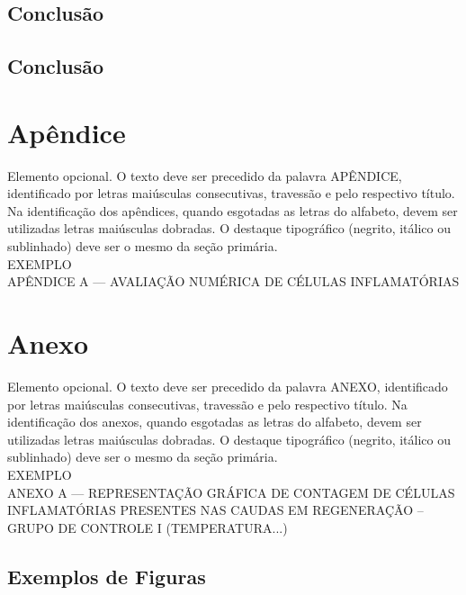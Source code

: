 \documentclass{Arquivos/TrabalhoAcademico}
\begin{document}
\section{Conclusão}
\lipsum[1]
\section{Conclusão}
\lipsum[1]


\postextual %


\printbibliography[heading=none]


\inicioApendices
\chapter{Apêndice}
Elemento opcional. O texto deve ser precedido da palavra APÊNDICE, identificado por letras maiúsculas
consecutivas, travessão e pelo respectivo título. Na identificação dos apêndices, quando esgotadas
as letras do alfabeto, devem ser utilizadas letras maiúsculas dobradas. O destaque tipográfico (negrito,
itálico ou sublinhado) deve ser o mesmo da seção primária.\\[1em]

\noindent EXEMPLO\\[1em]

\noindent APÊNDICE A — AVALIAÇÃO NUMÉRICA DE CÉLULAS INFLAMATÓRIAS


\inicioAnexos
\chapter{Anexo}
Elemento opcional. O texto deve ser precedido da palavra ANEXO, identificado por letras maiúsculas consecutivas, travessão e pelo respectivo título. Na identificação dos anexos, quando esgotadas as letras do alfabeto, devem ser utilizadas letras maiúsculas dobradas. O destaque tipográfico (negrito, itálico ou sublinhado) deve ser o mesmo da seção primária.\\[1em]

\noindent EXEMPLO\\[1em]

\noindent ANEXO A — REPRESENTAÇÃO GRÁFICA DE CONTAGEM DE CÉLULAS INFLAMATÓRIAS PRESENTES
NAS CAUDAS EM REGENERAÇÃO – GRUPO DE CONTROLE I (TEMPERATURA...)


\section{Exemplos de Figuras}
\end{document}
